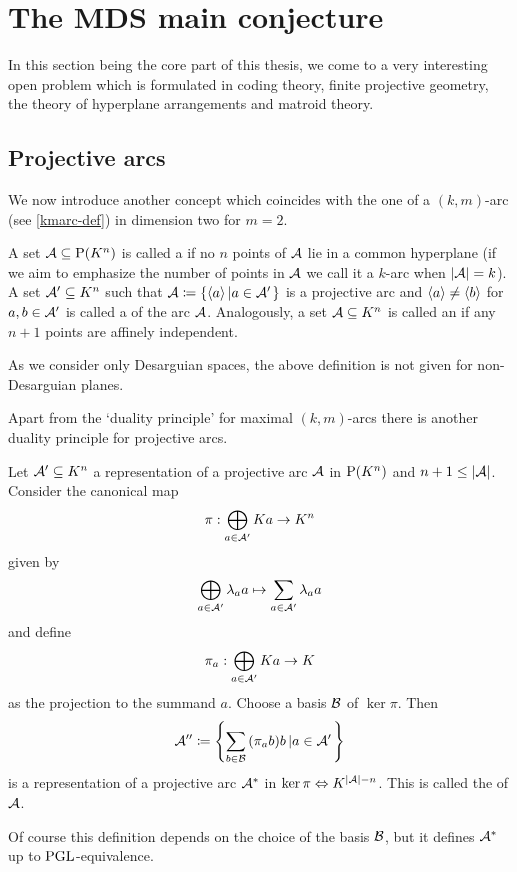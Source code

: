 \section{The MDS main conjecture}\label{sec-mds-connections}

In this section being the core part of this thesis, we come to a very interesting open problem which is formulated in coding theory, finite projective geometry, the theory of hyperplane arrangements and matroid theory.

\subsection{Projective arcs}

We now introduce another concept which coincides with the one of a $(k,m)$-arc (see \autoref{kmarc-def}) in dimension two for $m=2$.

\begin{definition}
    A set $\cA\setleq \P(K^n)$ is called a  if no $n$ points of $\mathcal{A}$ lie in a common hyperplane (if we aim to emphasize the number of points in $\mathcal{A}$ we call it a $k$-arc when $\left|\mathcal{A}\right|=k$).
    A set $\mathcal{A}'\subseteq K^n$ such that $\cA\defeq\set{\gen a}[a\in\cA']$ is a projective arc and $\gen a\neq\gen b$ for $a,b\in\mathcal{A}'$ is called a  of the arc $\mathcal{A}$.
    Analogously, a set $\mathcal{A}\subseteq K^n$ is called an  if any $n+1$ points are affinely independent.
\end{definition}

\begin{remark}
    As we consider only Desarguian spaces, the above definition is not given for non-Desarguian planes.
\end{remark}

Apart from the `duality principle' for maximal $(k,m)$-arcs there is another duality principle for projective arcs.

\begin{definition}\label{def-dual-arc}
    Let $\mathcal{A}'\subseteq K^n$ a representation of a projective arc $\mathcal{A}$ in $\P(K^n)$ and $n+1\leq \left|\mathcal{A}\right|$. Consider the canonical map
    $$\pi:\bigoplus_{a\in\mathcal{A}'}{Ka}\rightarrow K^n$$
    given by
    $$\bigoplus_{a\in\mathcal{A}'}{\lambda_a a}\mapsto \sum_{a\in\mathcal{A}'}{\lambda_a a}$$
    and define
    $$\pi_a:\bigoplus_{a\in \mathcal{A}'}{Ka}\rightarrow K$$
    as the projection to the summand $a$.
    Choose a basis $\mathcal{B}$ of $\ker \pi$. Then
    $$
    \cA''\defeq\set{\sum_{b\in\cB}{(\pi_a b)b}}[a\in\cA']
    $$
    is a representation of a projective arc ${\mathcal{A}}^{\ast}$ in $\ker \pi \iso K^{\card\cA -n}$.
    This is called the  of $\mathcal{A}$.
\end{definition}
\begin{remark}
Of course this definition depends on the choice of the basis $\mathcal{B}$, but it defines ${\mathcal{A}}^{\ast}$ up to $\mathrm{PGL}$-equivalence.
\end{remark}

